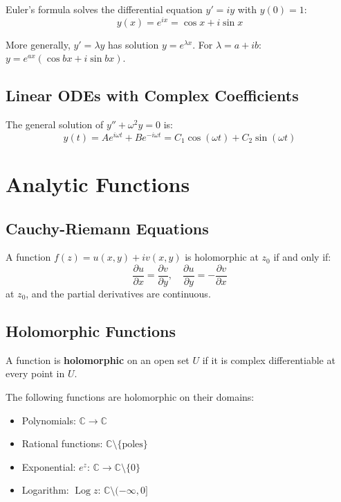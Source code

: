 Euler's formula solves the differential equation $y' = iy$ with $y(0) = 1$:
\[
y(x) = e^{ix} = \cos x + i \sin x
\]

More generally, $y' = \lambda y$ has solution $y = e^{\lambda x}$.
For $\lambda = a + ib$: $y = e^{ax}(\cos bx + i \sin bx)$.

\subsection{Linear ODEs with Complex Coefficients}

\begin{theorem}
The general solution of $y'' + \omega^2 y = 0$ is:
\[
y(t) = A e^{i\omega t} + B e^{-i\omega t} = C_1 \cos(\omega t) + C_2 \sin(\omega t)
\]
\end{theorem}

\section{Analytic Functions}

\subsection{Cauchy-Riemann Equations}

\begin{theorem}
A function $f(z) = u(x,y) + iv(x,y)$ is holomorphic at $z_0$ if and only if:
\[
\frac{\partial u}{\partial x} = \frac{\partial v}{\partial y}, \quad \frac{\partial u}{\partial y} = -\frac{\partial v}{\partial x}
\]
at $z_0$, and the partial derivatives are continuous.
\end{theorem}

\subsection{Holomorphic Functions}

\begin{definition}
A function is \textbf{holomorphic} on an open set $U$ if it is complex differentiable at every point in $U$.
\end{definition}

\begin{theorem}
The following functions are holomorphic on their domains:
\begin{itemize}
\item Polynomials: $\mathbb{C} \to \mathbb{C}$
\item Rational functions: $\mathbb{C} \setminus \{\text{poles}\}$
\item Exponential: $e^z$: $\mathbb{C} \to \mathbb{C} \setminus \{0\}$
\item Logarithm: $\operatorname{Log} z$: $\mathbb{C} \setminus (-\infty, 0]$
\end{itemize}
\end{theorem}

